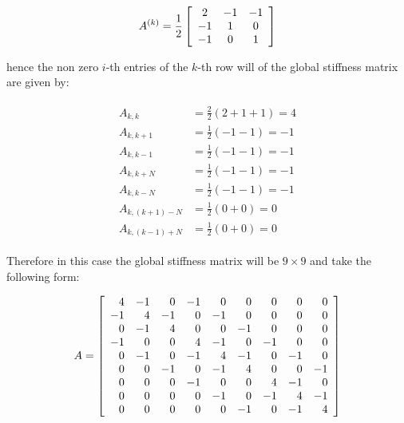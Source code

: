 \begin{equation}
    A^{(k)} = \frac{1}{2}\left[\begin{array}{c c c}
            2 & -1 & -1 \\ -1 & 1 & 0 \\ -1 & 0 & 1
    \end{array}\right]
\end{equation}

hence the non zero $i$-th entries of the $k$-th row will of the global
stiffness matrix are given by:

\begin{align}
  \begin{split}
    A_{k,k} &= \frac{2}{2}(2 + 1 + 1) = 4 \\
    A_{k,k+1} &= \frac{1}{2}(-1 -1) = -1 \\
    A_{k,k-1} &= \frac{1}{2}(-1 -1) = -1  \\
    A_{k,k+N} &= \frac{1}{2}(-1 -1) = -1 \\
    A_{k,k-N} &= \frac{1}{2}(-1 -1) = -1 \\
    A_{k,(k+1)-N} &= \frac{1}{2}(0 + 0) = 0 \\
    A_{k,(k-1)+N} &= \frac{1}{2}(0 + 0) = 0
  \end{split}
\end{align}

Therefore in this case the global stiffness matrix will be
$9 \times 9$ and take the following form:

\begin{equation}
    A = \left[\begin{array}{r r r r r r r r r}
        4 & -1 &  0 & -1 &  0 &  0 &  0 &  0 &  0 \\
       -1 &  4 & -1 &  0 & -1 &  0 &  0 &  0 &  0 \\
        0 & -1 &  4 &  0 &  0 & -1 &  0 &  0 &  0 \\
       -1 &  0 &  0 &  4 & -1 &  0 & -1 &  0 &  0 \\
        0 & -1 &  0 & -1 &  4 & -1 &  0 & -1 &  0 \\
        0 &  0 & -1 &  0 & -1 &  4 &  0 &  0 & -1 \\
        0 &  0 &  0 & -1 &  0 &  0 &  4 & -1 &  0 \\
        0 &  0 &  0 &  0 & -1 &  0 & -1 &  4 & -1 \\
        0 &  0 &  0 &  0 &  0 & -1 &  0 & -1 & 4
    \end{array}\right]
\end{equation}

